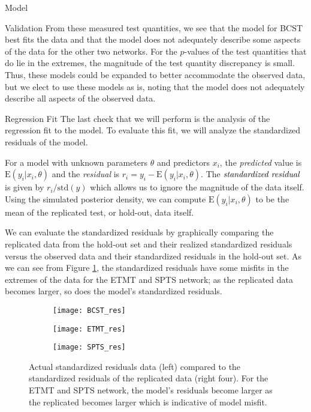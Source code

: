 \begin{chapter}{Model}
\begin{section}{Validation}
    From these measured test quantities, we see that the model for BCST best fits the data and that
    the model does not adequately describe some aspects of the data for the other two networks.
    For the $p$-values of the test quantities that do lie in the extremes, the magnitude
    of the test quantity discrepancy is small. Thus, these models could be expanded to better accommodate
    the observed data, but we elect to use these models as is, noting that the
    model does not adequately describe all aspects of the observed data.

  \begin{subsection}{Regression Fit}
    The last check that we will perform is the analysis of the regression fit to the
    model. To evaluate this fit, we will analyze the standardized residuals of the model.

    For a model with unknown parameters $\theta$ and predictors $x_i$, the \emph{predicted}
    value is $\text{E}(y_i | x_i, \theta)$ and the \emph{residual} is $r_i = y_i - \text{E}(y_i | x_i, \theta)$.
    The $\emph{standardized residual}$ is given by $r_i / \text{std}(y)$ which allows us to
    ignore the magnitude of the data itself. Using the simulated posterior density,
    we can compute $\text{E}(y_i | x_i, \theta)$
    to be the mean of the replicated test, or hold-out, data itself.

    We can evaluate the standardized residuals by graphically comparing the replicated data from the hold-out set
    and their realized standardized residuals versus the observed data and their standardized residuals in the hold-out set.
    As we can see from Figure \ref{fig:res}, the standardized residuals have some misfits in the extremes of the data
    for the ETMT and SPTS network; as the replicated data becomes larger, so does the model's standardized residuals.

    \begin{figure}[!h]
      \begin{subfigure}[b]{.75\textwidth}
        \centering
        \texttt{[image: BCST\_res]}
      \end{subfigure}
      \begin{subfigure}[b]{.75\textwidth}
        \centering
        \texttt{[image: ETMT\_res]}
      \end{subfigure}
      \begin{subfigure}[b]{.75\textwidth}
        \centering
        \texttt{[image: SPTS\_res]}
      \end{subfigure}
      \caption{Actual standardized residuals data (left) compared to the standardized residuals of the replicated data (right four). For the ETMT and SPTS
        network, the model's residuals become larger as the replicated becomes larger which is indicative of model misfit.}
      \label{fig:res}
    \end{figure}


\end{subsection}
\end{section}
\end{chapter}
